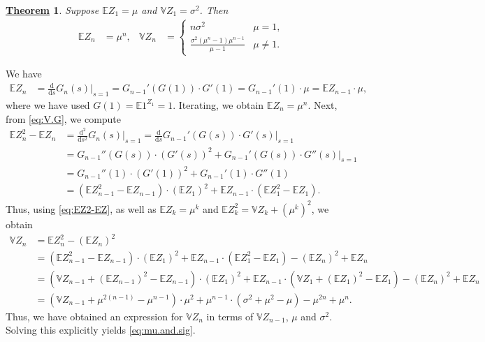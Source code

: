 \documentclass[12pt]{book}
\numberwithin{equation}{chapter}
\theoremstyle{plain}
\newtheorem{theorem}{\underline{Theorem}}
\numberwithin{theorem}{section}
\theoremstyle{definition}
\numberwithin{exercise}{chapter}
\let\oldendproof\endproof
\renewenvironment{proof}[1][\proofname]{%
  \oldproof[\scshape\underline{#1}]%
}{\oldendproof}
\newcommand{\<}{\langle}
\renewcommand{\>}{\rangle}
\renewcommand{\(}{\left(}
\renewcommand{\)}{\right)}
\renewcommand{\[}{\left[}
\renewcommand{\]}{\right]}
\newcommand\Eb{\mathds{E}}
\newcommand\Vb{\mathds{V}}
\newcommand\sig{\sigma}
\newcommand\dd{\mathrm{d}}
\begin{document}
\begin{theorem}
Suppose $\Eb Z_1 = \mu$ and $\Vb Z_1 = \sig^2$.  Then
\begin{align}
\Eb Z_n
	&=	\mu^n , &
\Vb Z_n
	&=	\left\{ \begin{array}{ll}
			n \sig^2 & \mu = 1 , \\
			\frac{\sig^2 (\mu^n-1)\mu^{n-1}}{\mu-1} & \mu \neq 1 .
			\end{array} \right. \label{eq:mu.and.sig}
\end{align}
\end{theorem}

\begin{proof}
We have
\begin{align}
\Eb Z_n
	&=	\frac{\dd}{\dd s}G_n(s) \Big|_{s=1}
	=		G_{n-1}'(G(1)) \cdot G'(1)
	=		G_{n-1}'(1) \cdot \mu
	=		\Eb Z_{n-1} \cdot \mu ,
\end{align}
where we have used $G(1) = \Eb 1^{Z_1} = 1$.
Iterating, we obtain $\Eb Z_n = \mu^n$.  Next, from \eqref{eq:V.G}, we compute
\begin{align}
\Eb Z_n^2 - \Eb Z_n
	&=	\frac{\dd^2}{\dd s^2}G_n(s) \Big|_{s=1} 
	=		\frac{\dd}{\dd s} G_{n-1}'(G(s)) \cdot G'(s) \Big|_{s=1} \\
	&=	G_{n-1}''(G(s)) \cdot ( G'(s) )^2 +  G_{n-1}'(G(s)) \cdot G''(s) \Big|_{s=1} \\
	&=	G_{n-1}''(1) \cdot ( G'(1) )^2 +  G_{n-1}'(1) \cdot G''(1) \\
	&=	\( \Eb Z_{n-1}^2 - \Eb Z_{n-1} \) \cdot ( \Eb Z_1 )^2 + \Eb Z_{n-1} \cdot \( \Eb Z_1^2 - \Eb Z_1 \) . \label{eq:EZ2-EZ}
\end{align}
Thus, using \eqref{eq:EZ2-EZ}, as well as $\Eb Z_k = \mu^k$ and $\Eb Z_k^2 = \Vb Z_k + (\mu^k)^2$, we obtain
\begin{align}
\Vb Z_n
	&=	\Eb Z_n^2 - ( \Eb Z_n )^2 \\
	&=	\( \Eb Z_{n-1}^2 - \Eb Z_{n-1} \) \cdot ( \Eb Z_1 )^2 + \Eb Z_{n-1} \cdot \( \Eb Z_1^2 - \Eb Z_1 \) - ( \Eb Z_n )^2 + \Eb Z_n \\
	&=	\( \Vb Z_{n-1} + (\Eb Z_{n-1})^2 - \Eb Z_{n-1} \) \cdot ( \Eb Z_1 )^2 + \Eb Z_{n-1} \cdot \( \Vb Z_1 + (\Eb Z_1)^2 - \Eb Z_1 \) - ( \Eb Z_n )^2 + \Eb Z_n \\
	&=	\( \Vb Z_{n-1} + \mu^{2(n-1)} - \mu^{n-1} \) \cdot \mu^2 + \mu^{n-1} \cdot \( \sig^2 + \mu^2 - \mu \) - \mu^{2n} + \mu^n .
\end{align}
Thus, we have obtained an expression for $\Vb Z_n$ in terms of $\Vb Z_{n-1}$, $\mu$ and $\sig^2$.  Solving this explicitly yields \eqref{eq:mu.and.sig}.
\end{proof}
\end{document}
